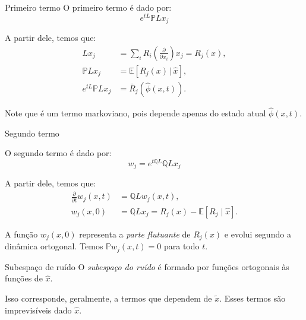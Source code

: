 
\begin{frame}{Primeiro termo}
O primeiro termo é dado por:
\begin{equation}
	e^{tL} \mathbb{P}L x_j
	\label{eq:primeiro-termo-mz}
\end{equation}

A partir dele, temos que:
\begin{align*}
	Lx_j &= \sum_i R_i\left(\frac{\partial}{\partial x_i}\right)x_j = R_j(x), \\
	\mathbb{P}Lx_j &= \mathbb{E}[R_j(x)\,|\,\hat{x}], \\
	e^{tL}\mathbb{P}Lx_j &= \bar{R}_j\left(\hat{\phi}(x,t)\right).
\end{align*}

\footnotesize{Note que é um termo markoviano, pois depende apenas do estado atual $\hat{\phi}(x,t)$.}
\end{frame}


\begin{frame}{Segundo termo}

O segundo termo é dado por:
\begin{equation*}
	w_j = e^{t\mathbb{Q}L} \mathbb{Q}L x_j
\end{equation*}

A partir dele, temos que:
\begin{align}
	\frac{\partial}{\partial t} w_j(x,t) &= \mathbb{Q}L w_j(x,t), \nonumber\\
	w_j(x,0) &= \mathbb{Q}L x_j = R_j(x) - \mathbb{E}[R_j \mid \hat{x}]. 
    \label{eq:mori-zwanzig-dinamica-ortogonal}
\end{align}

A função $w_j(x,0)$ representa a \textit{parte flutuante} de $R_j(x)$ e evolui segundo a dinâmica ortogonal. Temos $\mathbb{P} w_j(x,t) = 0$ para todo $t$.
\end{frame}


\begin{frame}{Subespaço de ruído}
O \textit{subespaço do ruído} é formado por funções ortogonais às funções de $\hat{x}$.

Isso corresponde, geralmente, a termos que dependem de $\tilde{x}$. Esses termos são imprevisíveis dado $\hat{x}$.
\end{frame}

